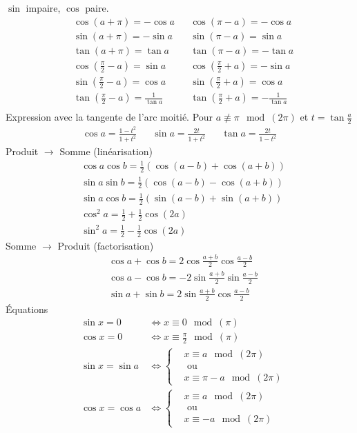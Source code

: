 $\sin$ impaire, $\cos$ paire.
\begin{align*}
  &\cos(a+\pi) = -\cos a & & \cos (\pi-a) = -\cos a \\
  &\sin(a+\pi) = -\sin a & & \sin (\pi-a) = \sin a \\
  &\tan(a+\pi) = \tan a & & \tan (\pi-a) = -\tan a \\
  &\cos(\frac{\pi}{2}-a) = \sin a & & \cos(\frac{\pi}{2}+a) = -\sin a\\ 
  &\sin(\frac{\pi}{2}-a) = \cos a & & \sin(\frac{\pi}{2}+a) = \cos a\\ 
  &\tan(\frac{\pi}{2}-a) = \frac{1}{\tan a } & & \tan(\frac{\pi}{2}+a) = -\frac{1}{\tan a}\\ 
\end{align*}
Expression avec la tangente de l'arc moitié.\newline
Pour $a\not \equiv \pi \mod (2\pi)$ et $t = \tan \frac{a}{2}$
\begin{align*}
 \cos a  = \frac{1-t^2}{1+t^2} & &
  \sin a = \frac{2t}{1+t^2} & &
  \tan a = \frac{2t}{1-t^2} 
\end{align*}
Produit $\rightarrow$ Somme (linéarisation)
\begin{align*}
 &\cos a \cos b = \frac{1}{2}\left(\cos(a-b) +\cos(a+b)\right)\\
 &\sin a \sin b = \frac{1}{2}\left(\cos(a-b)-\cos(a+b) \right)\\
 &\sin a \cos b = \frac{1}{2}\left(\sin(a-b)+\sin(a+b) \right) \\
 &\cos^2 a = \frac{1}{2}+\frac{1}{2}\cos(2a)\\
 &\sin^2 a = \frac{1}{2}-\frac{1}{2}\cos(2a)
\end{align*}
Somme $\rightarrow$ Produit (factorisation)
\begin{align*}
 &\cos a + \cos b = 2\cos \frac{a+b}{2} \cos \frac{a-b}{2} \\  
 &\cos a - \cos b = -2\sin \frac{a+b}{2} \sin \frac{a-b}{2} \\
 &\sin a + \sin b = 2\sin \frac{a+b}{2} \cos \frac{a-b}{2}
\end{align*}
\'Equations
\begin{align*}
 &\sin x = 0 &\Leftrightarrow x \equiv 0 \mod(\pi) \\
 &\cos x = 0 &\Leftrightarrow x \equiv \frac{\pi}{2} \mod(\pi) \\
 &\sin x = \sin a &\Leftrightarrow
\left\lbrace 
\begin{aligned}
 &x \equiv a \mod(2\pi)\\
&\text{ ou }\\
 &x \equiv \pi - a \mod(2\pi)
\end{aligned}
\right. \\
 &\cos x = \cos a &\Leftrightarrow
\left\lbrace 
\begin{aligned}
 &x \equiv a \mod(2\pi)\\
&\text{ ou }\\
 &x \equiv  - a \mod(2\pi)
\end{aligned}
\right. 
\end{align*}

